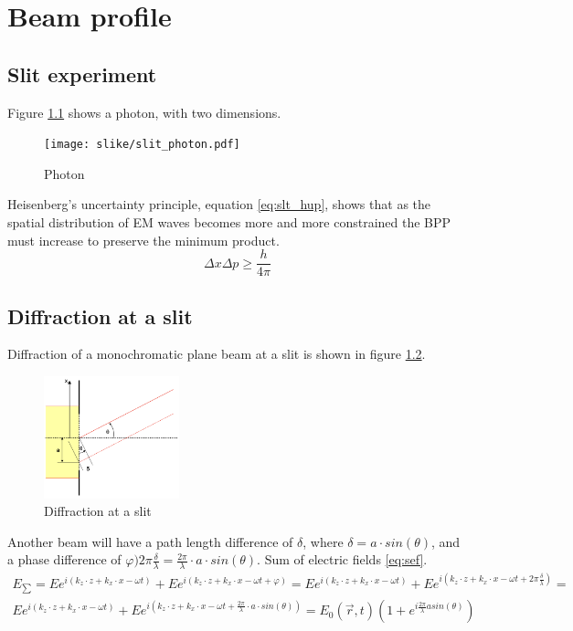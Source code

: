 \chapter{Beam profile}

\section{Slit experiment}
Figure \ref{fig:slit_photon} shows a photon, with two dimensions.
\begin{figure}[h!]
    \centering
    \texttt{[image: slike/slit\_photon.pdf]}
    \caption{Photon}
    \label{fig:slit_photon}
\end{figure}
Heisenberg's uncertainty principle, equation \ref{eq:slt_hup}, shows that as the spatial distribution of EM waves
becomes more and more constrained the BPP must increase to preserve the minimum product.
\begin{equation}
    \Delta x \Delta p \ge \frac{h}{4 \pi}
    \label{eq:slt_hup}
\end{equation}

\section{Diffraction at a slit}
Diffraction of a monochromatic plane beam at a slit is shown in figure \ref{fig:slit1}.
\begin{figure}[h!]
    \centering
    \includegraphics[width=0.35\textwidth]{slike/slit1.png}
    \caption{Diffraction at a slit}
    \label{fig:slit1}
\end{figure}
Another beam will have a path length difference of $\delta$, where $\delta = a \cdot sin(\theta)$, and a phase difference
of $\varphi ) 2 \pi \frac{\delta}{\lambda} = \frac{2 \pi}{\lambda} \cdot a \cdot sin(\theta)$.
Sum of electric fields \ref{eq:sef}.
\begin{equation}
    \begin{aligned}
    E_{\sum} = E e^{i(k_z \cdot z + k_x \cdot x - \omega t)} + E e^{i(k_z \cdot z + k_x \cdot x - \omega t + \varphi)} =
    E e^{i(k_z \cdot z + k_x \cdot x - \omega t)} + E e^{i(k_z \cdot z + k_x \cdot x - \omega t + 2\pi \frac{\delta}{\lambda})} = \\
    E e^{i(k_z \cdot z + k_x \cdot x - \omega t)} + E e^{i(k_z \cdot z + k_x \cdot x - \omega t + \frac{2 \pi}{\lambda} \cdot a \cdot sin(\theta))} =  E_0(\vec{r},t) (1 + e^{i \frac{2\pi}{\lambda}a sin(\theta)}) 
    \end{aligned}
    \label{eq:sef}
\end{equation}

